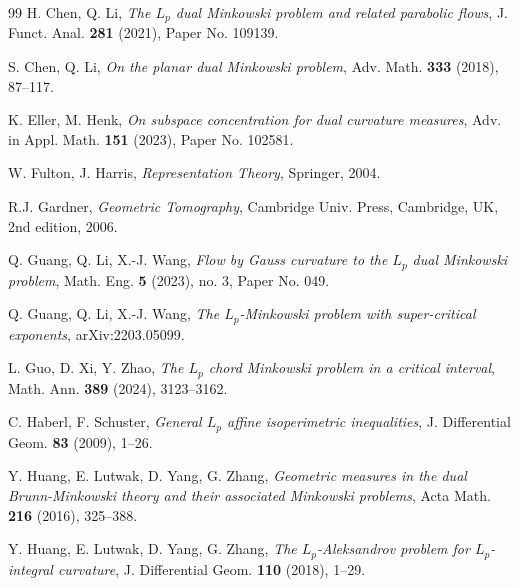 \documentclass[12pt, reqno]{amsart}
\theoremstyle{definition}
\theoremstyle{remark}
\numberwithin{equation}{section}
\newcommand{\Lp}{L_{p}}
\begin{document}
\begin{thebibliography}{99}
			H. Chen, Q. Li, \emph{The $\Lp$ dual Minkowski problem and related parabolic flows}, J. Funct. Anal. \textbf{281} (2021),
			Paper No. 109139.
			
			 S. Chen, Q. Li, \emph{On the planar dual Minkowski problem}, Adv. Math. \textbf{333} (2018), 87--117.
			
			
			K. Eller, M. Henk, \emph{On subspace concentration for dual curvature measures}, Adv. in Appl. Math. \textbf{151}
			(2023), Paper No. 102581.
			
			
			
			
			W. Fulton, J. Harris, \emph{Representation Theory},   Springer, 2004.
			
			
			
			R.J. Gardner,
			\emph{ Geometric Tomography},
			Cambridge Univ. Press, Cambridge, UK, 2nd edition, 2006.
			
			Q. Guang, Q. Li, X.-J. Wang, \emph{Flow by Gauss curvature to the $\Lp$ dual Minkowski problem}, Math.
			Eng. \textbf{5} (2023), no. 3, Paper No. 049.
			
			 Q. Guang, Q. Li, X.-J. Wang, \emph{The $\Lp$-Minkowski problem with super-critical exponents},
			arXiv:2203.05099.
			
			
			
			
			
			
			
			
			
			
			 L. Guo, D. Xi, Y. Zhao, \emph{The $\Lp$ chord Minkowski problem in a critical interval}, Math. Ann. \textbf{389} (2024),
			 3123--3162.
			
			
			
			
			
			C. Haberl, F. Schuster, \emph{General $L_{p}$ affine isoperimetric inequalities}, J. Differential Geom. \textbf{83} (2009), 1--26.
			
			
			Y. Huang, E. Lutwak, D. Yang, G. Zhang, \emph{Geometric measures in the dual
				Brunn-Minkowski theory and their associated Minkowski problems}, Acta Math.
			\textbf{216} (2016), 325--388.
			
			Y. Huang, E. Lutwak, D. Yang,  G. Zhang,
			\emph{The $ L_{p} $-Aleksandrov problem for $ L_{p} $-integral		curvature},
			J. Differential Geom. \textbf{110} (2018), 1--29.
			

\end{thebibliography}
\end{document}
